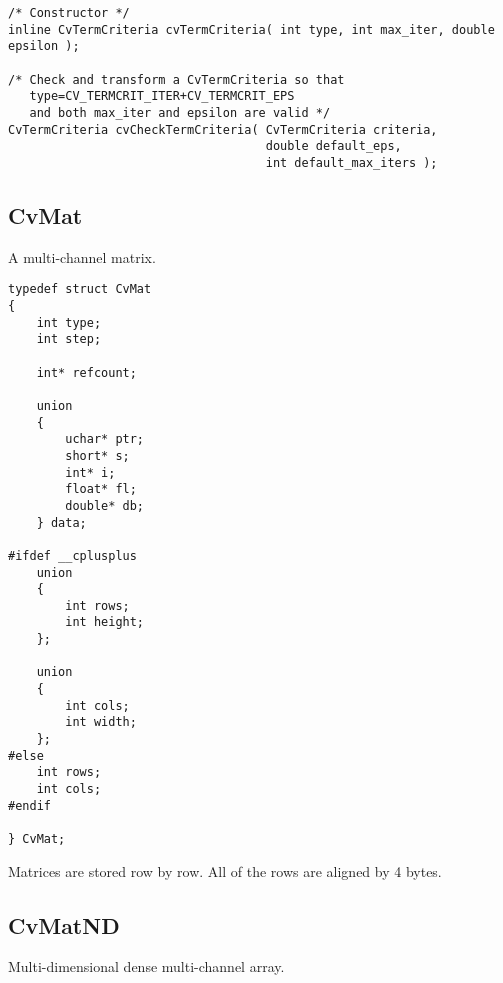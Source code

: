 \begin{description}
\end{description}

\begin{lstlisting}
/* Constructor */
inline CvTermCriteria cvTermCriteria( int type, int max_iter, double epsilon );

/* Check and transform a CvTermCriteria so that 
   type=CV_TERMCRIT_ITER+CV_TERMCRIT_EPS
   and both max_iter and epsilon are valid */
CvTermCriteria cvCheckTermCriteria( CvTermCriteria criteria,
                                    double default_eps,
                                    int default_max_iters );
\end{lstlisting}

\subsection{CvMat}\label{CvMat}
A multi-channel matrix.

\begin{lstlisting}
typedef struct CvMat
{
    int type; 
    int step; 

    int* refcount; 

    union
    {
        uchar* ptr;
        short* s;
        int* i;
        float* fl;
        double* db;
    } data; 

#ifdef __cplusplus
    union
    {
        int rows;
        int height;
    };

    union
    {
        int cols;
        int width;
    };
#else
    int rows; 
    int cols; 
#endif

} CvMat;
\end{lstlisting}

\begin{description}
\end{description}

Matrices are stored row by row. All of the rows are aligned by 4 bytes.


\subsection{CvMatND}\label{CvMatND}
Multi-dimensional dense multi-channel array.

